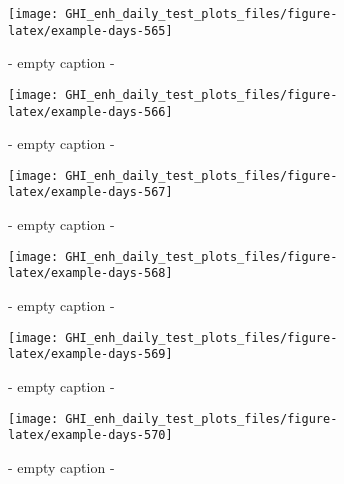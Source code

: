 \documentclass[
  10pt,
  a4paper,oneside]{article}
\begin{document}
\begin{figure}[H]

{\centering \texttt{[image: GHI\_enh\_daily\_test\_plots\_files/figure-latex/example-days-565]} 

}

\caption{ - empty caption - }\label{fig:example-days-565}
\end{figure}

\begin{figure}[H]

{\centering \texttt{[image: GHI\_enh\_daily\_test\_plots\_files/figure-latex/example-days-566]} 

}

\caption{ - empty caption - }\label{fig:example-days-566}
\end{figure}

\begin{figure}[H]

{\centering \texttt{[image: GHI\_enh\_daily\_test\_plots\_files/figure-latex/example-days-567]} 

}

\caption{ - empty caption - }\label{fig:example-days-567}
\end{figure}

\begin{figure}[H]

{\centering \texttt{[image: GHI\_enh\_daily\_test\_plots\_files/figure-latex/example-days-568]} 

}

\caption{ - empty caption - }\label{fig:example-days-568}
\end{figure}

\begin{figure}[H]

{\centering \texttt{[image: GHI\_enh\_daily\_test\_plots\_files/figure-latex/example-days-569]} 

}

\caption{ - empty caption - }\label{fig:example-days-569}
\end{figure}

\begin{figure}[H]

{\centering \texttt{[image: GHI\_enh\_daily\_test\_plots\_files/figure-latex/example-days-570]} 

}

\caption{ - empty caption - }\label{fig:example-days-570}
\end{figure}
\end{document}
